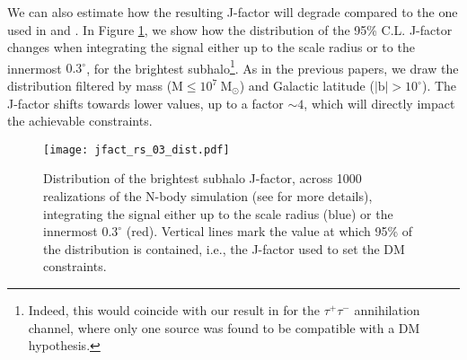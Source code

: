 \documentclass[%
 reprint,
nofootinbib,
 amsmath,amssymb,
 aps,
]{revtex4-2}
\begin{document}
We can also estimate how the resulting J-factor will degrade compared to the one used in  and . In Figure \ref{fig:jfact_dist_rs_03}, we show how the distribution of the 95\% C.L. J-factor changes when integrating the signal either up to the scale radius or to the innermost $0.3^\circ$, for the brightest subhalo\footnote{Indeed, this would coincide with our result in  for the $\tau^+\tau^-$ annihilation channel, where only one source was found to be compatible with a DM hypothesis.}. As in the previous papers, we draw the distribution filtered by mass ($\mathrm{M\leq10^7~M_{\odot}}$) and Galactic latitude ($\mathrm{|b|>10^\circ}$). The J-factor shifts towards lower values, up to a factor $\sim4$, which will directly impact the achievable constraints.

\begin{figure}[!ht]
\centering
\texttt{[image: jfact\_rs\_03\_dist.pdf]}
\caption{Distribution of the brightest subhalo J-factor, across 1000 realizations of the N-body simulation (see  for more details), integrating the signal either up to the scale radius (blue) or the innermost $0.3^\circ$ (red). Vertical lines mark the value at which 95\% of the distribution is contained, i.e., the J-factor used to set the DM constraints.}
\label{fig:jfact_dist_rs_03}
\end{figure}
\end{document}
